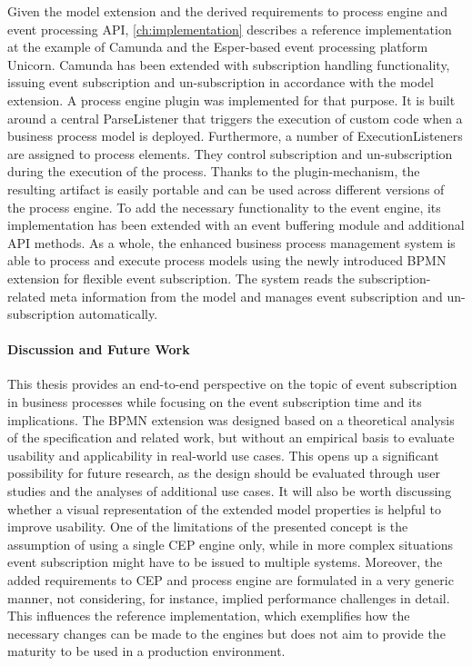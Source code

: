 Given the model extension and the derived requirements to process engine and event processing API, \autoref{ch:implementation} describes a reference implementation at the example of Camunda and the Esper-based event processing platform Unicorn.
Camunda has been extended with subscription handling functionality, issuing event subscription and un-subscription in accordance with the model extension.
A process engine plugin was implemented for that purpose. It is built around a central ParseListener that triggers the execution of custom code when a business process model is deployed. Furthermore, a number of ExecutionListeners are assigned to process elements. They control subscription and un-subscription during the execution of the process.
Thanks to the plugin-mechanism, the resulting artifact is easily portable and can be used across different versions of the process engine.
To add the necessary functionality to the event engine, its implementation has been extended with an event buffering module and additional API methods.
As a whole, the enhanced business process management system is able to process and execute process models using the newly introduced BPMN extension for flexible event subscription.
The system reads the subscription-related meta information from the model and manages event subscription and un-subscription automatically.


\paragraph{Discussion and Future Work}
This thesis provides an end-to-end perspective on the topic of event subscription in business processes while focusing on the event subscription time and its implications.
The BPMN extension was designed based on a theoretical analysis of the specification and related work, but without an empirical basis to evaluate usability and applicability in real-world use cases.
This opens up a significant possibility for future research, as the design should be evaluated through user studies and the analyses of additional use cases. It will also be worth discussing whether a visual representation of the extended model properties is helpful to improve usability.
One of the limitations of the presented concept is the assumption of using a single CEP engine only, while in more complex situations event subscription might have to be issued to multiple systems.
Moreover, the added requirements to CEP and process engine are formulated in a very generic manner, not considering, for instance, implied performance challenges in detail.
This influences the reference implementation, which exemplifies how the necessary changes can be made to the engines but does not aim to provide the maturity to be used in a production environment.

